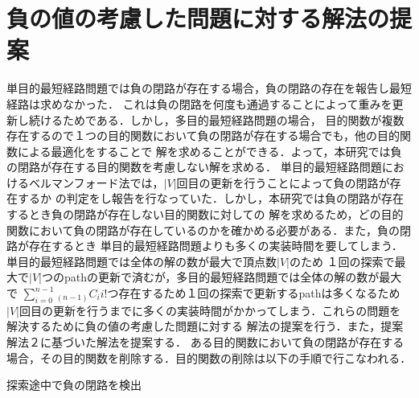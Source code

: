 \documentclass[12pt]{optlab-bachelor}
\begin{document}
%

\section{負の値の考慮した問題に対する解法の提案}

単目的最短経路問題では負の閉路が存在する場合，負の閉路の存在を報告し最短経路は求めなかった．
これは負の閉路を何度も通過することによって重みを更新し続けるためである．しかし，多目的最短経路問題の場合，
目的関数が複数存在するので１つの目的関数において負の閉路が存在する場合でも，他の目的関数による最適化をすることで
解を求めることができる．よって，本研究では負の閉路が存在する目的関数を考慮しない解を求める．
単目的最短経路問題におけるベルマンフォード法では，$|V|$回目の更新を行うことによって負の閉路が存在するか
の判定をし報告を行なっていた．しかし，本研究では負の閉路が存在するとき負の閉路が存在しない目的関数に対しての
解を求めるため，どの目的関数において負の閉路が存在しているのかを確かめる必要がある．また，負の閉路が存在するとき
単目的最短経路問題よりも多くの実装時間を要してしまう．単目的最短経路問題では全体の解の数が最大で頂点数$|V|$のため
１回の探索で最大で$|V|$つのpathの更新で済むが，多目的最短経路問題では全体の解の数が最大で
$\displaystyle \sum_{i=0}^{n-1} {}_{(n-1)}C_i i!$つ存在するため１回の探索で更新するpathは多くなるため
$|V|$回目の更新を行うまでに多くの実装時間がかかってしまう．これらの問題を解決するために負の値の考慮した問題に対する
解法の提案を行う．また，提案解法２に基づいた解法を提案する．
ある目的関数において負の閉路が存在する場合，その目的関数を削除する．目的関数の削除は以下の手順で行こなわれる．

\begin{description}
  \item[探索途中で負の閉路を検出]
\end{description}
\end{document}
